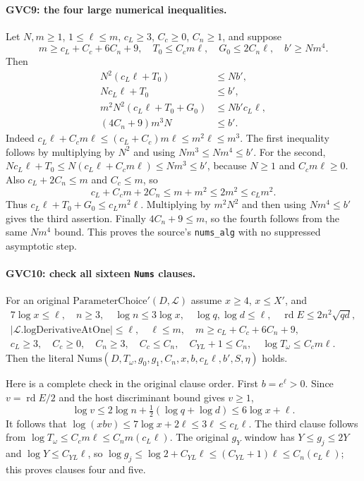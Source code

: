 \paragraph{GVC9: the four large numerical inequalities.}
\label{claim:GVC9}
Let $N,m\ge1$, $1\le\ell\le m$, $c_L\ge3$,
$C_c\ge0$, $C_n\ge1$, and suppose
\[
 m\ge c_L+C_c+6C_n+9,\quad
 T_0\le C_cm\ell,\quad G_0\le2C_n\ell,\quad
 b'\ge Nm^4.
\]
Then
\[
 \begin{split}
 N^2(c_L\ell+T_0)&\le Nb',\\
 Nc_L\ell+T_0&\le b',\\
 m^2N^2(c_L\ell+T_0+G_0)&\le Nb'c_L\ell,\\
 (4C_n+9)m^3N&\le b'.
 \end{split}\tag{GVC.16}
\]
Indeed
$c_L\ell+C_cm\ell\le(c_L+C_c)m\ell
 \le m^2\ell\le m^3$.
The first inequality follows by multiplying by $N^2$ and using
$Nm^3\le Nm^4\le b'$.
For the second,
$Nc_L\ell+T_0\le N(c_L\ell+C_cm\ell)\le Nm^3\le b'$,
because $N\ge1$ and $C_cm\ell\ge0$.
Also $c_L+2C_n\le m$ and $C_c\le m$, so
\[
 c_L+C_cm+2C_n\le m+m^2\le2m^2\le c_Lm^2.
\]
Thus $c_L\ell+T_0+G_0\le c_Lm^2\ell$.
Multiplying by $m^2N^2$ and then using $Nm^4\le b'$
gives the third assertion.
Finally $4C_n+9\le m$, so the fourth follows from the same
$Nm^4$ bound. This proves the source's \texttt{nums\_alg}
with no suppressed asymptotic step.

\paragraph{GVC10: check all sixteen \texttt{Nums} clauses.}
\label{claim:GVC10}
For an original $\mathrm{ParameterChoice}'(D,\mathcal L)$
assume $x\ge4$, $x\le X'$, and
\[
 \begin{gathered}
 7\log x\le\ell,\quad
 n\ge3,\quad \log n\le3\log x,\quad
 \log q,\log d\le\ell,\quad
 \operatorname{rd}E\le2n^2\sqrt{qd},\\
 |\mathcal L.\mathrm{logDerivativeAtOne}|\le\ell,\quad
 \ell\le m,\quad m\ge c_L+C_c+6C_n+9,\\
 c_L\ge3,\quad C_c\ge0,\quad C_n\ge3,\quad
 C_c\le C_n,\quad C_{YL}+1\le C_n,\quad
 \log T_\omega\le C_cm\ell .
 \end{gathered}                                               \tag{GVC.17}
\]
Then the literal
$\mathrm{Nums}(D,T_\omega,g_0,g_1,C_n,x,b,c_L\ell,b',S,\eta)$
holds.

Here is a complete check in the original clause order.
First $b=e^\ell>0$.
Since $v=\operatorname{rd}E/2$ and the host discriminant bound
gives $v\ge1$,
\[
 \log v\le2\log n+\tfrac12(\log q+\log d)
          \le6\log x+\ell .
\]
It follows that
$\log(xbv)\le7\log x+2\ell\le3\ell\le c_L\ell$.
The third clause follows from
$\log T_\omega\le C_cm\ell\le C_nm(c_L\ell)$.
The original $g_Y$ window has $Y\le g_j\le2Y$ and
$\log Y\le C_{YL}\ell$, so
$\log g_j\le\log2+C_{YL}\ell\le(C_{YL}+1)\ell
 \le C_n(c_L\ell)$; this proves clauses four and five.

